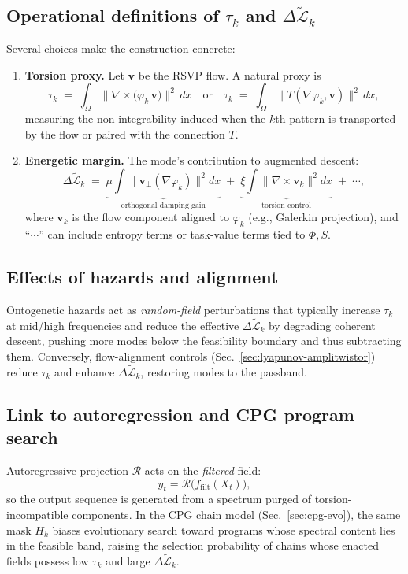 \documentclass[a4paper,11pt]{article}
\begin{document}
\subsection{Operational definitions of $\tau_k$ and $\Delta\widetilde{\mathcal{L}}_k$}
Several choices make the construction concrete:
\begin{enumerate}
\item \textbf{Torsion proxy.} Let $\mathbf v$ be the RSVP flow. A natural proxy is
\[
\tau_k \;=\; \int_\Omega \big\|\nabla\times\big(\varphi_k\,\mathbf v\big)\big\|^2\,dx
\quad\text{or}\quad
\tau_k \;=\;\int_\Omega \|T(\nabla\varphi_k,\mathbf v)\|^2\,dx,
\]
measuring the non-integrability induced when the $k$th pattern is transported by
the flow or paired with the connection $T$.
\item \textbf{Energetic margin.} The mode’s contribution to augmented descent:
\[
\Delta\widetilde{\mathcal{L}}_k \;=\; 
\underbrace{\mu \int \|\mathbf v_\perp(\nabla \varphi_k)\|^2 dx}_{\text{orthogonal damping gain}}
\;+\;
\underbrace{\xi \int \|\nabla\times \mathbf v_k\|^2 dx}_{\text{torsion control}}
\;+\;\cdots,
\]
where $\mathbf v_k$ is the flow component aligned to $\varphi_k$ (e.g.,
Galerkin projection), and ``$\cdots$'' can include entropy terms or task-value
terms tied to $\Phi,S$.
\end{enumerate}

\subsection{Effects of hazards and alignment}
Ontogenetic hazards act as \emph{random-field} perturbations that typically
increase $\tau_k$ at mid/high frequencies and reduce the effective
$\Delta\widetilde{\mathcal{L}}_k$ by degrading coherent descent, pushing more
modes below the feasibility boundary and thus subtracting them. Conversely,
flow-alignment controls (Sec.~\ref{sec:lyapunov-amplitwistor}) reduce $\tau_k$
and enhance $\Delta\widetilde{\mathcal{L}}_k$, restoring modes to the passband.

\subsection{Link to autoregression and CPG program search}
Autoregressive projection $\mathcal{R}$ acts on the \emph{filtered} field:
\[
y_t=\mathcal{R}\big(f_{\mathrm{filt}}(X_t)\big),
\]
so the output sequence is generated from a spectrum purged of torsion-incompatible
components. In the CPG chain model (Sec.~\ref{sec:cpg-evo}), the same mask
$H_k$ biases evolutionary search toward programs whose spectral content lies in
the feasible band, raising the selection probability of chains whose enacted
fields possess low $\tau_k$ and large $\Delta\widetilde{\mathcal{L}}_k$.
\end{document}
